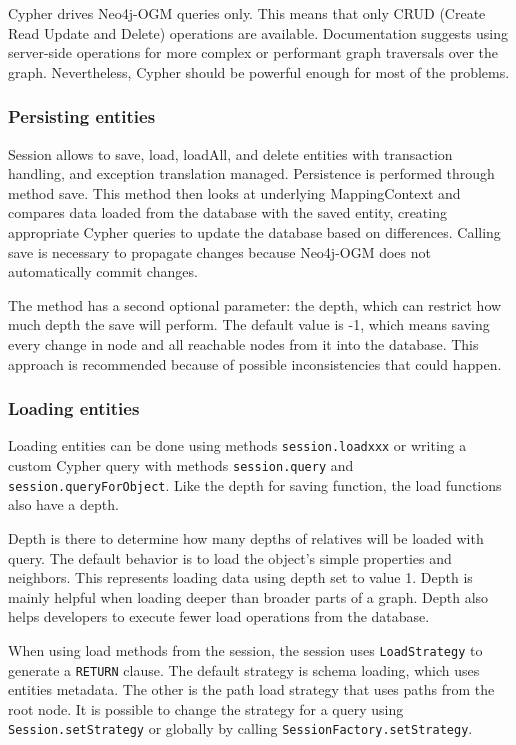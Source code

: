 \documentclass[thesis=M,english]{FITthesis}[2019/12/23]
\begin{document}
Cypher drives Neo4j-OGM queries only. This means that only CRUD (Create Read Update and Delete) operations are available. Documentation suggests using server-side operations for more complex or performant graph traversals over the graph. Nevertheless, Cypher should be powerful enough for most of the problems.

\subsubsection {Persisting entities}

Session allows to save, load, loadAll, and delete entities with transaction handling, and exception translation managed. Persistence is performed through method save. This method then looks at underlying MappingContext and compares data loaded from the database with the saved entity, creating appropriate Cypher queries to update the database based on differences. Calling save is necessary to propagate changes because Neo4j-OGM does not automatically commit changes.

The method has a second optional parameter: the depth, which can restrict how much depth the save will perform. The default value is -1, which means saving every change in node and all reachable nodes from it into the database. This approach is recommended because of possible inconsistencies that could happen.

\subsubsection {Loading entities}

Loading entities can be done using methods \texttt{session.loadxxx} or writing a custom Cypher query with methods \texttt{session.query} and \texttt{session.queryForObject}.
Like the depth for saving function, the load functions also have a depth.

Depth is there to determine how many depths of relatives will be loaded with query. The default behavior is to load the object's simple properties and neighbors.
This represents loading data using depth set to value 1. Depth is mainly helpful when loading deeper than broader parts of a graph. Depth also helps developers to
execute fewer load operations from the database.

When using load methods from the session, the session uses \texttt{LoadStrategy} to generate a \texttt{RETURN} clause. The default strategy is schema loading,
which uses entities metadata. The other is the path load strategy that uses paths from the root node. It is possible to change the strategy for a query using \texttt{Session.setStrategy}
or globally by calling \texttt{SessionFactory.setStrategy}.
\end{document}
